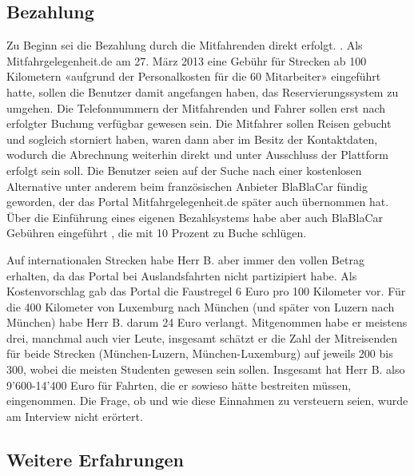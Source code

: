 \documentclass[11pt,a4paper]{scrartcl}
\begin{document}
\subsection{Bezahlung}

Zu Beginn sei die Bezahlung durch die Mitfahrenden direkt erfolgt. \cite[Zeile 12]{interview}. Als Mitfahrgelegenheit.de am 27. März 2013 eine Gebühr für Strecken ab 100 Kilometern «aufgrund der Personalkosten für die 60 Mitarbeiter» eingeführt hatte, sollen die Benutzer damit angefangen haben, das Reservierungssystem zu umgehen. Die Telefonnummern der Mitfahrenden und Fahrer sollen erst nach erfolgter Buchung verfügbar gewesen sein. Die Mitfahrer sollen Reisen gebucht und sogleich storniert haben, waren dann aber im Besitz der Kontaktdaten, wodurch die Abrechnung weiterhin direkt und unter Ausschluss der Plattform erfolgt sein soll. Die Benutzer seien auf der Suche nach einer kostenlosen Alternative unter anderem beim französischen Anbieter BlaBlaCar fündig geworden, der das Portal Mitfahrgelegenheit.de später auch übernommen hat. Über die Einführung eines eigenen Bezahlsystems habe aber auch BlaBlaCar Gebühren eingeführt \cite{zeit}, die mit 10 Prozent zu Buche schlügen. \cite[Zeilen 12-13]{interview}

Auf internationalen Strecken habe Herr B. aber immer den vollen Betrag erhalten, da das Portal bei Auslandsfahrten nicht partizipiert habe. \cite[Zeilen 72-73]{interview} Als Kostenvorschlag gab das Portal die Faustregel 6 Euro pro 100 Kilometer vor. \cite[Zeilen 67-68]{interview} Für die 400 Kilometer von Luxemburg nach München (und später von Luzern nach München) habe Herr B. darum 24 Euro verlangt. \cite[Zeilen 67-68]{interview} Mitgenommen habe er meistens drei, manchmal auch vier Leute, insgesamt schätzt er die Zahl der Mitreisenden für beide Strecken (München-Luzern, München-Luxemburg) auf jeweils 200 bis 300, wobei die meisten Studenten gewesen sein sollen.\cite[Zeilen 55-56]{interview} Insgesamt hat Herr B. also 9’600-14’400 Euro für Fahrten, die er sowieso hätte bestreiten müssen, eingenommen. Die Frage, ob und wie diese Einnahmen zu versteuern seien, wurde am Interview nicht erörtert.

\subsection{Weitere Erfahrungen}
\end{document}
